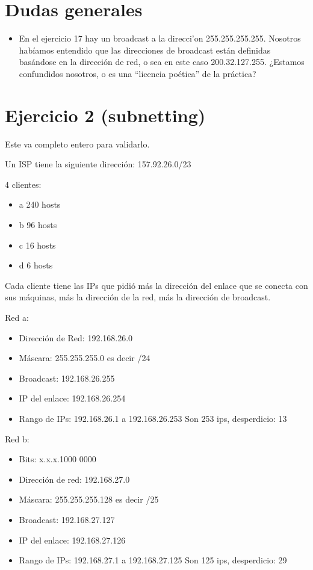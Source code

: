 \documentclass[a4paper,10pt]{article}
\begin{document}
\section*{Dudas generales}
\begin{itemize}
	\item En el ejercicio 17 hay un broadcast a la direcci'on 255.255.255.255.  Nosotros habíamos entendido que las direcciones de broadcast están definidas basándose en la dirección de red, o sea en este caso 200.32.127.255.  ¿Estamos confundidos nosotros, o es una ``licencia poética'' de la práctica?
\end{itemize}

\section*{Ejercicio 2 (subnetting)}
Este va completo entero para validarlo.

Un ISP tiene la siguiente dirección: 
157.92.26.0/23

4 clientes:

\begin{itemize}
	\item a 240 hosts
	\item b 96 hosts
	\item c 16 hosts
	\item d 6 hosts
\end{itemize}

Cada cliente tiene las IPs que pidió más la dirección del enlace que se conecta con sus máquinas, más la dirección de la red, más la dirección de broadcast.


Red a:
\begin{itemize}
	\item Dirección de Red: 192.168.26.0 
	\item Máscara: 255.255.255.0 es decir /24 
	\item Broadcast: 192.168.26.255 
	\item IP del enlace: 192.168.26.254
	\item Rango de IPs: 192.168.26.1 a 192.168.26.253 Son 253 ips, desperdicio: 13
\end{itemize}


Red b:
\begin{itemize}
	\item Bits: x.x.x.1000 0000
	\item Dirección de red: 192.168.27.0 
	\item Máscara: 255.255.255.128 es decir /25
	\item Broadcast: 192.168.27.127
	\item IP del enlace: 192.168.27.126
	\item Rango de IPs: 192.168.27.1 a 192.168.27.125 Son 125 ips, desperdicio: 29
\end{itemize}
\end{document}
